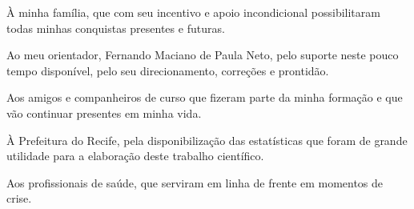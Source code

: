 \begin{agradecimentos}
À minha família, que com seu incentivo e apoio incondicional possibilitaram todas minhas conquistas presentes e futuras.

Ao meu orientador, Fernando Maciano de Paula Neto, pelo suporte neste pouco tempo disponível, pelo seu direcionamento, correções e prontidão.

Aos amigos e companheiros de curso que fizeram parte da minha formação e que vão continuar presentes em minha vida.

À Prefeitura do Recife, pela disponibilização das estatísticas que foram de grande utilidade para a elaboração deste trabalho científico.

Aos profissionais de saúde, que serviram em linha de frente em momentos de crise.


\end{agradecimentos}